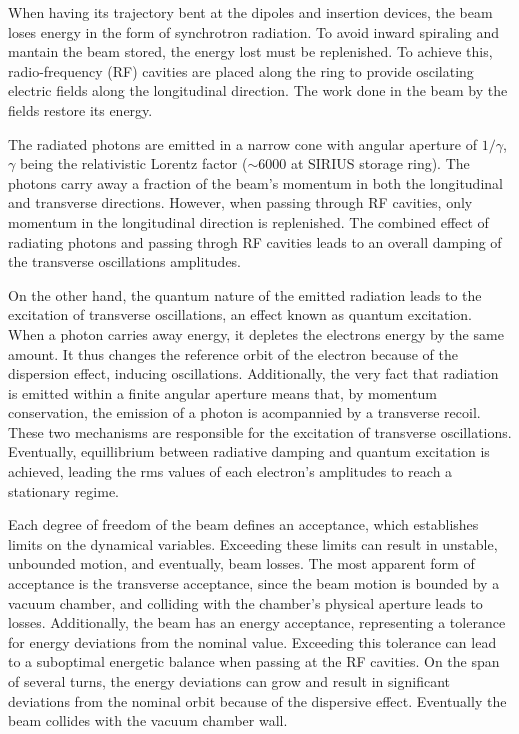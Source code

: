 When having its trajectory bent at the dipoles and insertion devices,
the beam loses energy in the form of synchrotron radiation. To avoid inward spiraling and mantain the beam stored, the energy lost must be replenished. To achieve this, radio-frequency (RF) cavities are placed along the ring to provide oscilating electric fields along the longitudinal direction. The work done in the beam by the fields restore its energy.

The radiated photons are emitted in a narrow cone with angular aperture of $1/\gamma$, $\gamma$ being the relativistic Lorentz factor ($\sim 6000$ at SIRIUS storage ring). The photons carry away a fraction of the beam's momentum in both the longitudinal and transverse directions. However, when passing through RF cavities, only momentum in the longitudinal direction is replenished. The combined effect of radiating photons and passing throgh RF cavities leads to an overall damping of the transverse oscillations amplitudes.

On the other hand, the quantum nature of the emitted radiation leads to the excitation of transverse oscillations, an effect known as quantum excitation. When a photon carries away energy, it depletes the electrons energy by the same amount. It thus changes the reference orbit of the electron because of the dispersion effect, inducing oscillations. Additionally, the very fact that radiation is emitted within a finite angular aperture means that, by momentum conservation, the emission of a photon is acompannied by a transverse recoil. These two mechanisms are responsible for the excitation of transverse oscillations. Eventually, equillibrium between radiative damping and quantum excitation is achieved, leading the rms values of each electron's amplitudes to reach a stationary regime.

Each degree of freedom of the beam defines an acceptance, which establishes limits on the dynamical variables. Exceeding these limits can result in unstable, unbounded motion, and eventually, beam losses. The most apparent form of acceptance is the transverse acceptance, since the beam motion is bounded by a vacuum chamber, and colliding with the chamber's physical aperture leads to losses. Additionally, the beam has an energy acceptance, representing a tolerance for energy deviations from the nominal value. Exceeding this tolerance can lead to a suboptimal energetic balance when passing at the RF cavities. On the span of several turns, the energy deviations can grow and result in significant deviations from the nominal orbit because of the dispersive effect. Eventually the beam collides with the vacuum chamber wall.

